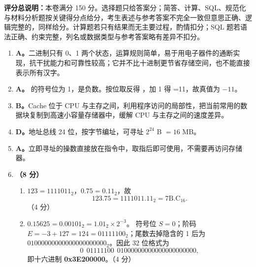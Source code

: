 \documentclass[a4paper,11pt]{article}
\begin{document}

\noindent\textbf{评分总说明：}本卷满分 150 分。选择题只给答案分；简答、计算、SQL、规范化与材料分析题按关键得分点给分，考生表述与参考答案不完全一致但意思正确、逻辑完整的，同样给分。计算题若只有结果而无主要过程，酌情扣分；SQL 题若语法正确、约束完整，列名或数据类型与参考答案略有差异不扣分。


\begin{enumerate}[start=1, label=\textbf{\arabic*.}, leftmargin=2.4em, itemsep=0.45em]

\item \textbf{A。}二进制只有 0、1 两个状态，运算规则简单，易于用电子器件的通断实现，抗干扰能力和可靠性较高；它并不比十进制更节省存储空间，也不能直接表示所有汉字。

\item \textbf{A。} 的符号位为 1，是负数。按位取反得 ，加 1 得 =11，故真值为 $-11$。

\item \textbf{B。}Cache 位于 CPU 与主存之间，利用程序访问的局部性，把当前常用的数据块复制到高速小容量存储器中，缓解 CPU 与主存之间的速度差异。

\item \textbf{D。}地址总线 24 位，按字节编址，可寻址 $2^{24}$ B $=16$ MB。

\item \textbf{A。}立即寻址的操数直接放在指令中，取指后即可使用，不需要再访问存储器。

\item \textbf{（8 分）}
\begin{enumerate}[label=（\arabic*）, leftmargin=2.2em, itemsep=1pt]
  \item $123=1111011_2$，$0.75=0.11_2$，故
  \[
  123.75=1111011.11_2=\text{7B.C}_{16}.
  \]
  \hfill（4 分）

  \item $0.15625=0.00101_2=1.01_2\times2^{-3}$。
  符号位 $S=0$；阶码 $E=-3+127=124=01111100_2$；尾数去掉隐含的 1 后为
  $01000000000000000000000_2$。因此 32 位格式为
  \[
  0\ \ 01111100\ \ 01000000000000000000000,
  \]
  即十六进制 \textbf{0x3E200000}。\hfill（4 分）
\end{enumerate}


\end{enumerate}
\end{document}

